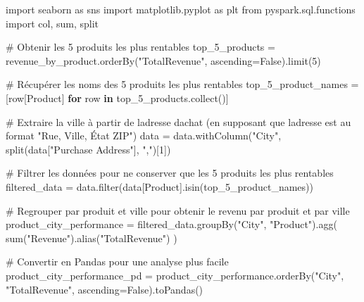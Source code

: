 \documentclass[
  letterpaper,
  DIV=11,
  numbers=noendperiod]{scrartcl}
\newenvironment{Shaded}{\begin{snugshade}}{\end{snugshade}}
\newcommand{\BuiltInTok}[1]{\textcolor[rgb]{0.00,0.23,0.31}{#1}}
\newcommand{\CommentTok}[1]{\textcolor[rgb]{0.37,0.37,0.37}{#1}}
\newcommand{\ControlFlowTok}[1]{\textcolor[rgb]{0.00,0.23,0.31}{\textbf{#1}}}
\newcommand{\DecValTok}[1]{\textcolor[rgb]{0.68,0.00,0.00}{#1}}
\newcommand{\ImportTok}[1]{\textcolor[rgb]{0.00,0.46,0.62}{#1}}
\newcommand{\KeywordTok}[1]{\textcolor[rgb]{0.00,0.23,0.31}{\textbf{#1}}}
\newcommand{\NormalTok}[1]{\textcolor[rgb]{0.00,0.23,0.31}{#1}}
\newcommand{\OperatorTok}[1]{\textcolor[rgb]{0.37,0.37,0.37}{#1}}
\newcommand{\StringTok}[1]{\textcolor[rgb]{0.13,0.47,0.30}{#1}}
\newcommand{\VariableTok}[1]{\textcolor[rgb]{0.07,0.07,0.07}{#1}}
\begin{document}
\begin{Shaded}
\begin{Highlighting}[]
\ImportTok{import}\NormalTok{ seaborn }\ImportTok{as}\NormalTok{ sns}
\ImportTok{import}\NormalTok{ matplotlib.pyplot }\ImportTok{as}\NormalTok{ plt}
\ImportTok{from}\NormalTok{ pyspark.sql.functions }\ImportTok{import}\NormalTok{ col, }\BuiltInTok{sum}\NormalTok{, split}

\CommentTok{\# Obtenir les 5 produits les plus rentables}
\NormalTok{top\_5\_products }\OperatorTok{=}\NormalTok{ revenue\_by\_product.orderBy(}\StringTok{"TotalRevenue"}\NormalTok{, ascending}\OperatorTok{=}\VariableTok{False}\NormalTok{).limit(}\DecValTok{5}\NormalTok{)}

\CommentTok{\# Récupérer les noms des 5 produits les plus rentables}
\NormalTok{top\_5\_product\_names }\OperatorTok{=}\NormalTok{ [row[}\StringTok{\textquotesingle{}Product\textquotesingle{}}\NormalTok{] }\ControlFlowTok{for}\NormalTok{ row }\KeywordTok{in}\NormalTok{ top\_5\_products.collect()]}

\CommentTok{\# Extraire la ville à partir de l\textquotesingle{}adresse d\textquotesingle{}achat (en supposant que l\textquotesingle{}adresse est au format "Rue, Ville, État ZIP")}
\NormalTok{data }\OperatorTok{=}\NormalTok{ data.withColumn(}\StringTok{"City"}\NormalTok{, split(data[}\StringTok{"Purchase Address"}\NormalTok{], }\StringTok{","}\NormalTok{)[}\DecValTok{1}\NormalTok{])}

\CommentTok{\# Filtrer les données pour ne conserver que les 5 produits les plus rentables}
\NormalTok{filtered\_data }\OperatorTok{=}\NormalTok{ data.}\BuiltInTok{filter}\NormalTok{(data[}\StringTok{\textquotesingle{}Product\textquotesingle{}}\NormalTok{].isin(top\_5\_product\_names))}

\CommentTok{\# Regrouper par produit et ville pour obtenir le revenu par produit et par ville}
\NormalTok{product\_city\_performance }\OperatorTok{=}\NormalTok{ filtered\_data.groupBy(}\StringTok{"City"}\NormalTok{, }\StringTok{"Product"}\NormalTok{).agg(}
    \BuiltInTok{sum}\NormalTok{(}\StringTok{"Revenue"}\NormalTok{).alias(}\StringTok{"TotalRevenue"}\NormalTok{)}
\NormalTok{)}

\CommentTok{\# Convertir en Pandas pour une analyse plus facile}
\NormalTok{product\_city\_performance\_pd }\OperatorTok{=}\NormalTok{ product\_city\_performance.orderBy(}\StringTok{"City"}\NormalTok{, }\StringTok{"TotalRevenue"}\NormalTok{, ascending}\OperatorTok{=}\VariableTok{False}\NormalTok{).toPandas()}


\end{Highlighting}
\end{Shaded}
\end{document}
